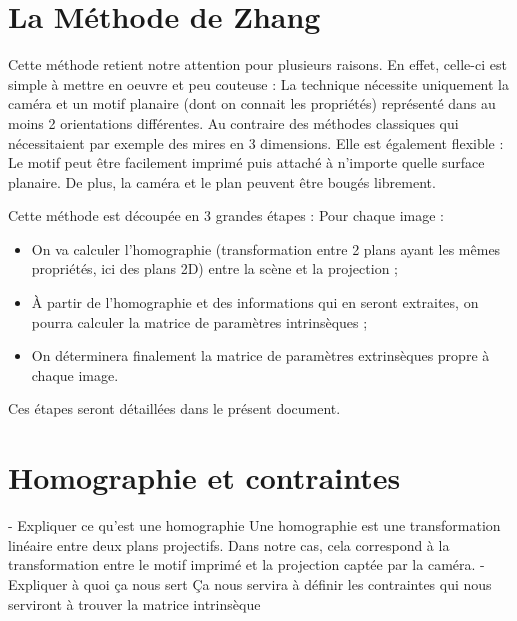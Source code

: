 \documentclass{article}
\begin{document}

\section{La Méthode de Zhang}

Cette méthode retient notre attention pour plusieurs raisons. En effet, celle-ci est simple à mettre en oeuvre et peu couteuse :
La technique nécessite uniquement la caméra et un motif planaire (dont on connait les propriétés) représenté dans au moins 2 orientations différentes. Au contraire des méthodes classiques qui nécessitaient par exemple des mires en 3 dimensions.
Elle est également flexible :
Le motif peut être facilement imprimé puis attaché à n'importe quelle surface planaire. De plus, la caméra et le plan peuvent être bougés librement.

Cette méthode est découpée en 3 grandes étapes :
Pour chaque image :
\begin{itemize}
  \item On va calculer l'homographie (transformation entre 2 plans ayant les mêmes propriétés, ici des plans 2D) entre la scène et la projection ;
  \item À partir de l'homographie et des informations qui en seront extraites, on pourra calculer la matrice de paramètres intrinsèques ;
  \item On déterminera finalement la matrice de paramètres extrinsèques propre à chaque image.
\end{itemize}

Ces étapes seront détaillées dans le présent document.

\clearpage


\section{Homographie et contraintes}

- Expliquer ce qu'est une homographie
Une homographie est une transformation linéaire entre deux plans projectifs.
Dans notre cas, cela correspond à la transformation entre le motif imprimé et la projection captée par la caméra.
- Expliquer à quoi ça nous sert
Ça nous servira à définir les contraintes qui nous serviront à trouver la matrice intrinsèque
\end{document}
